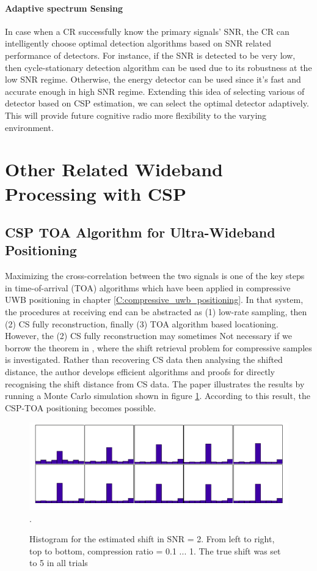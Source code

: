 \paragraph{Adaptive spectrum Sensing} In case when a CR successfully know the primary signals' SNR, the CR can intelligently choose optimal detection algorithms based on SNR related performance of detectors. For instance, if the SNR is detected to be very low, then cycle-stationary detection algorithm can be used due to its robustness at the low SNR regime. Otherwise, the energy detector can be used since it's fast and accurate enough in high SNR regime. Extending this idea of selecting various of detector based on CSP estimation, we can select the optimal detector adaptively. This will provide future cognitive radio more flexibility to the varying environment.

\section{Other Related Wideband Processing with CSP}

\subsection{CSP TOA Algorithm for Ultra-Wideband Positioning}\label{sct:csp_toa}
\indent \indent Maximizing the cross-correlation between the two signals is one of the key steps in time-of-arrival (TOA) algorithms which have been applied in compressive UWB positioning in chapter \ref{C:compressive_uwb_positioning}. In that system, the procedures at receiving end can be abstracted as (1) low-rate sampling, then (2) CS fully reconstruction, finally (3) TOA algorithm based locationing. However, the (2) CS fully reconstruction may sometimes Not necessary if we borrow the theorem in  \cite{ohlsson2013compressive}, where the shift retrieval problem for compressive samples is investigated. Rather than recovering CS data then analysing the shifted distance, the author develops efficient algorithms and proofs for directly recognising the shift distance from CS data. The paper illustrates the results by running a Monte Carlo simulation shown in figure \ref{csp-shift}. According to this result, the CSP-TOA positioning becomes possible.

\begin{figure}[!t]
\centering
\includegraphics[width=5.0in]{figs/csp-shift.png}
\DeclareGraphicsExtensions.
\caption{Histogram for the estimated shift in SNR = 2. From left to right, top to bottom, compression ratio = 0.1 ... 1. The true shift was set to 5 in all trials}\label{csp-shift}
\end{figure}

